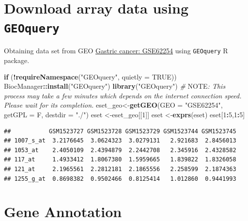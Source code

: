 \documentclass[
  12pt,
]{book}
\newenvironment{Shaded}{\begin{snugshade}}{\end{snugshade}}
\newcommand{\AlertTok}[1]{\textcolor[rgb]{0.94,0.16,0.16}{#1}}
\newcommand{\AttributeTok}[1]{\textcolor[rgb]{0.13,0.29,0.53}{#1}}
\newcommand{\CommentTok}[1]{\textcolor[rgb]{0.56,0.35,0.01}{\textit{#1}}}
\newcommand{\ConstantTok}[1]{\textcolor[rgb]{0.56,0.35,0.01}{#1}}
\newcommand{\ControlFlowTok}[1]{\textcolor[rgb]{0.13,0.29,0.53}{\textbf{#1}}}
\newcommand{\DecValTok}[1]{\textcolor[rgb]{0.00,0.00,0.81}{#1}}
\newcommand{\FunctionTok}[1]{\textcolor[rgb]{0.13,0.29,0.53}{\textbf{#1}}}
\newcommand{\NormalTok}[1]{#1}
\newcommand{\OtherTok}[1]{\textcolor[rgb]{0.56,0.35,0.01}{#1}}
\newcommand{\SpecialCharTok}[1]{\textcolor[rgb]{0.81,0.36,0.00}{\textbf{#1}}}
\newcommand{\StringTok}[1]{\textcolor[rgb]{0.31,0.60,0.02}{#1}}
\begin{document}
\hypertarget{download-array-data-using-geoquery}{%
\section{\texorpdfstring{Download array data using \texttt{GEOquery}}{Download array data using GEOquery}}\label{download-array-data-using-geoquery}}

Obtaining data set from GEO \href{https://pubmed.ncbi.nlm.nih.gov/25894828/}{Gastric cancer: GSE62254} using \texttt{GEOquery} R package.

\begin{Shaded}
\begin{Highlighting}[]
\ControlFlowTok{if}\NormalTok{ (}\SpecialCharTok{!}\FunctionTok{requireNamespace}\NormalTok{(}\StringTok{"GEOquery"}\NormalTok{, }\AttributeTok{quietly =} \ConstantTok{TRUE}\NormalTok{))  BiocManager}\SpecialCharTok{::}\FunctionTok{install}\NormalTok{(}\StringTok{"GEOquery"}\NormalTok{)}
\FunctionTok{library}\NormalTok{(}\StringTok{"GEOquery"}\NormalTok{)}
\CommentTok{\# }\AlertTok{NOTE}\CommentTok{: This process may take a few minutes which depends on the internet connection speed. Please wait for its completion.}
\NormalTok{eset\_geo}\OtherTok{\textless{}{-}}\FunctionTok{getGEO}\NormalTok{(}\AttributeTok{GEO     =} \StringTok{"GSE62254"}\NormalTok{, }\AttributeTok{getGPL  =}\NormalTok{ F, }\AttributeTok{destdir =} \StringTok{"./"}\NormalTok{)}
\NormalTok{eset    }\OtherTok{\textless{}{-}}\NormalTok{eset\_geo[[}\DecValTok{1}\NormalTok{]]}
\NormalTok{eset    }\OtherTok{\textless{}{-}}\FunctionTok{exprs}\NormalTok{(eset)}
\NormalTok{eset[}\DecValTok{1}\SpecialCharTok{:}\DecValTok{5}\NormalTok{,}\DecValTok{1}\SpecialCharTok{:}\DecValTok{5}\NormalTok{]}
\end{Highlighting}
\end{Shaded}

\begin{verbatim}
##           GSM1523727 GSM1523728 GSM1523729 GSM1523744 GSM1523745
## 1007_s_at  3.2176645  3.0624323  3.0279131   2.921683  2.8456013
## 1053_at    2.4050109  2.4394879  2.2442708   2.345916  2.4328582
## 117_at     1.4933412  1.8067380  1.5959665   1.839822  1.8326058
## 121_at     2.1965561  2.2812181  2.1865556   2.258599  2.1874363
## 1255_g_at  0.8698382  0.9502466  0.8125414   1.012860  0.9441993
\end{verbatim}

\hypertarget{gene-annotation}{%
\section{Gene Annotation}\label{gene-annotation}}
\end{document}
